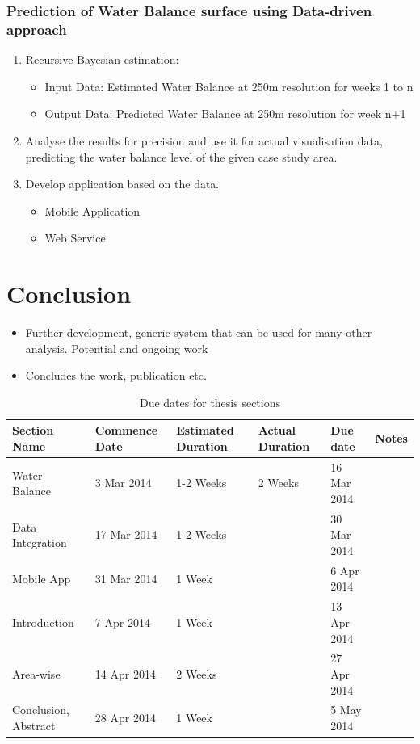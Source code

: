 \documentclass[12pt,journal,compsoc,onecolumn]{IEEEtran}
\begin{document}
\subsubsection{Prediction of Water Balance surface using Data-driven approach}
\begin{enumerate}
\item
Recursive Bayesian estimation:
\begin{itemize}
\item
Input Data: Estimated Water Balance at 250m resolution for weeks 1 to n
\item
Output Data: Predicted Water Balance at 250m resolution for week n+1
\end{itemize}
\item
Analyse the results for precision and use it for actual visualisation data, predicting the water balance level of the given case study area.
\item
Develop application based on the data.
\begin{itemize}
\item
Mobile Application
\item
Web Service
\end{itemize}

\end{enumerate}

\section{Conclusion}
\begin{itemize}
\item
Further development, generic system that can be used for many other analysis. Potential and ongoing work
\item
Concludes the work, publication etc.
\end{itemize}

\appendix

\begin{table}[H]
\begin{center}
    \begin{tabular}{ | l | l | l | l | l | p{4cm} |}
    \hline
    Section Name & Commence Date & Estimated Duration & Actual Duration & Due date & Notes \\ \hline
    Water Balance & 3 Mar 2014 & 1-2 Weeks & 2 Weeks & 16 Mar 2014 &  \\ \hline
   Data Integration & 17 Mar 2014 & 1-2 Weeks & & 30 Mar 2014 & \\ \hline
   Mobile App & 31 Mar 2014 & 1 Week & & 6 Apr 2014 & \\ \hline
   Introduction & 7 Apr 2014 & 1 Week & & 13 Apr 2014 & \\ \hline
   Area-wise & 14 Apr 2014 & 2 Weeks & & 27 Apr 2014 & \\ \hline
   Conclusion, Abstract & 28 Apr 2014 & 1 Week & & 5 May 2014 & \\ \hline
    \end{tabular}
\end{center}\caption{Due dates for thesis sections}
\label{table:duedates}
\end{table}
\end{document}
